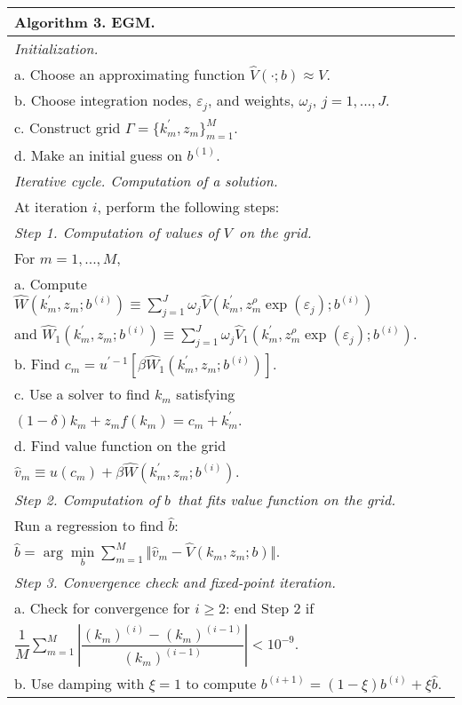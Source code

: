 {\small
\begin{tabular}{l}
\hline \hline
\textbf{Algorithm 3. EGM.} \\ \hline
\emph{Initialization.} \\
\quad a. Choose an approximating function $\widehat{V}(\cdot ;b)\approx V$.
\\
\quad b. Choose integration nodes, $\varepsilon _{j}$, and weights, $\omega
_{j}$, $j=1,...,J$. \\
\quad c. Construct grid $\Gamma =\{k_{m}^{\prime },z_{m}\}_{m=1}^{M}$. \\
\quad d. Make an initial guess on $b^{(1)}$. \\ \hline
\emph{Iterative cycle. Computation of a solution.} \\ \hline
\quad At iteration $i$, perform the following steps: \\
\emph{Step 1. Computation of values of }$V$\emph{\ on the grid.} \\
\quad For $m=1,...,M$, \\
\quad a. Compute $\widehat{W}\left( k_{m}^{\prime },z_{m};b^{(i)}\right)
\equiv \sum_{j=1}^{J}\omega _{j}\widehat{V}\left( k_{m}^{\prime
},z_{m}^{\rho }\exp \left( \varepsilon _{j}\right) ;b^{(i)}\right) $ \\
\quad and $\widehat{W}_{1}\left( k_{m}^{\prime },z_{m};b^{(i)}\right) \equiv
\sum_{j=1}^{J}\omega _{j}\widehat{V}_{1}\left( k_{m}^{\prime },z_{m}^{\rho
}\exp \left( \varepsilon _{j}\right) ;b^{(i)}\right) $. \\
\quad b. Find $c_{m}=u^{\prime -1}\left[ \beta \widehat{W}_{1}\left(
k_{m}^{\prime },z_{m};b^{(i)}\right) \right] $. \\
\quad c. Use a solver to find $k_{m}$ satisfying \\
\quad $(1-\delta )k_{m}+z_{m}f\left( k_{m}\right) =c_{m}+k_{m}^{\prime }$.
\\
\quad d. Find value function on the grid \\
\quad $\widehat{v}_{m}\equiv u(c_{m})+\beta \widehat{W}\left( k_{m}^{\prime
},z_{m};b^{(i)}\right) $. \\ \hline
\emph{Step 2. Computation of }$b$\emph{\ that fits value function on the
grid. } \\
\quad Run a regression to find $\widehat{b}:$ \\
\quad $\widehat{b}=\arg \underset{b}{\min }\sum_{m=1}^{M}\Vert \widehat{v}
_{m}-\widehat{V}(k_{m},z_{m};b)\Vert $. \\ \hline
\emph{Step 3. Convergence check and fixed-point iteration.} \\
\quad a. Check for convergence for $i\geq 2$: end Step 2 if \\
\quad $\dfrac{1}{M}\sum_{m=1}^{M}\left \vert \dfrac{(k_{m})^{\left( i\right)
}-(k_{m})^{\left( i-1\right) }}{(k_{m})^{\left( i-1\right) }}\right \vert
<10^{-9}.$ \\
\quad b. Use damping with $\xi =1$ to compute $b^{\left( i+1\right) }=(1-\xi
)b^{\left( i\right) }+\xi \widehat{b}$. \\ \hline \hline
\end{tabular}
}

